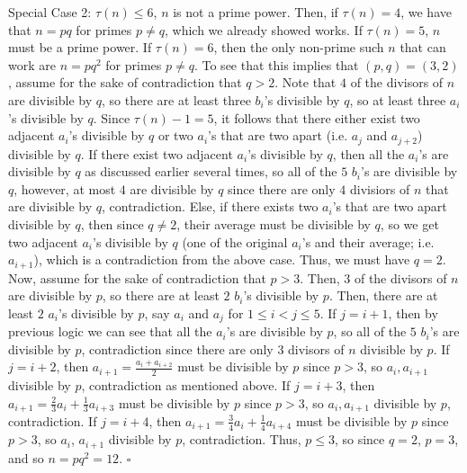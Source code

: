\documentclass[a4paper]{article}
\begin{document}
\begin{question}[c]{}
{Special Case 2: $\tau(n) \leq 6$, $n$ is not a prime power.
Then, if $\tau(n) = 4$, we have that $n = pq$ for primes $p\neq q$, which we already showed works. If $\tau(n) = 5$, $n$ must be a prime power. If $\tau(n) = 6$, then the only non-prime such $n$ that can work are $n = pq^2$ for primes $p\neq q$. To see that this implies that $(p, q) = (3, 2)$, assume for the sake of contradiction that $q> 2$. Note that $4$ of the divisors of $n$ are divisible by $q$, so there are at least three $b_i$'s divisible by $q$, so at least three $a_i$'s divisible by $q$. Since $\tau(n)-1 = 5$, it follows that there either exist two adjacent $a_i$'s divisible by $q$ or two $a_i$'s that are two apart (i.e. $a_j$ and $a_{j+2}$) divisible by $q$. If there exist two adjacent $a_i$'s divisible by $q$, then all the $a_i$'s are divisible by $q$ as discussed earlier several times, so all of the $5$ $b_i$'s are divisible by $q$, however, at most $4$ are divisible by $q$ since there are only $4$ divisiors of $n$ that are divisible by $q$, contradiction. Else, if there exists two $a_i$'s that are two apart divisible by $q$, then since $q\neq 2$, their average must be divisible by $q$, so we get two adjacent $a_i$'s divisible by $q$ (one of the original $a_i$'s and their average; i.e. $a_{i+1}$), which is a contradiction from the above case. Thus, we must have $q = 2$. Now, assume for the sake of contradiction that $p > 3$. Then, $3$ of the divisors of $n$ are divisible by $p$, so there are at least $2$ $b_i$'s divisible by $p$. Then, there are at least $2$ $a_i$'s divisible by $p$, say $a_i$ and $a_j$ for $1\leq i < j\leq 5$. If $j = i+1$, then by previous logic we can see that all the $a_i$'s are divisible by $p$, so all of the $5$ $b_i$'s are divisible by $p$, contradiction since there are only $3$ divisors of $n$ divisible by $p$. If $j = i+2$, then $a_{i+1} = \frac{a_i + a_{i+2}}{2}$ must be divisible by $p$ since $p > 3$, so $a_i, a_{i+1}$ divisible by $p$, contradiction as mentioned above. If $j = i+3$, then $a_{i+1} = \frac{2}{3}a_i + \frac{1}{3}a_{i+3}$ must be divisible by $p$ since $p > 3$, so $a_i, a_{i+1}$ divisible by $p$, contradiction. If $j = i+4$, then $a_{i+1} = \frac{3}{4}a_i + \frac{1}{4}a_{i+4}$ must be divisible by $p$ since $p > 3$, so $a_i$, $a_{i+1}$ divisible by $p$, contradiction. Thus, $p \leq 3$, so since $q = 2$, $p = 3$, and so $n=pq^2 = 12$. $\square$

}
\end{question}
\end{document}
